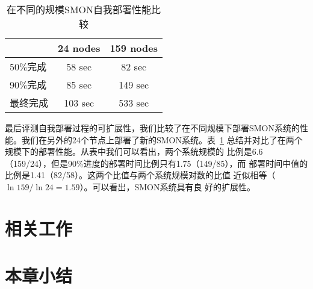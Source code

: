 
\begin{table}
\centering
  \begin{minipage}{0.8\linewidth}
    \centering
    \caption{在不同的规模SMON自我部署性能比较}
    \label{fig:scalability}
    \begin{tabular}{lcc}
    \toprule[1.5pt]
           & 24 nodes & 159 nodes\\
    \midrule[1pt]
    50\%完成 & 58 sec & 82 sec \\
    90\%完成 & 85 sec & 149 sec\\
    最终完成 & 103 sec & 533 sec\\
    \bottomrule[1.5pt]
    \end{tabular}
  \end{minipage}
\end{table}

最后评测自我部署过程的可扩展性，我们比较了在不同规模下部署SMON系统的性
能。我们在另外的24个节点上部署了新的SMON系统。表~\ref{fig:scalability}
总结并对比了在两个规模下的部署性能。从表中我们可以看出，两个系统规模的
比例是6.6（159/24），但是90\%进度的部署时间比例只有1.75（149/85），而
部署时间中值的比例是1.41（82/58）。这两个比值与两个系统规模对数的比值
近似相等（$\ln 159/\ln 24 = 1.59$）。可以看出，SMON系统具有良
好的扩展性。

\section{相关工作}
\label{sec:smon_related}

\section{本章小结}
\label{sec:smon_conclusion}
